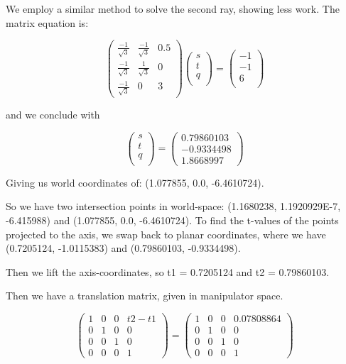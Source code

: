 \documentclass{letter}
\begin{document}
We employ a similar method to solve the second ray, showing less work. The matrix equation is:

$$
\begin{pmatrix}
\frac{-1}{\sqrt{3}} & \frac{-1}{\sqrt{3}} & 0.5 \\
\frac{-1}{\sqrt{3}} & \frac{1}{\sqrt{3}} & 0 \\
\frac{-1}{\sqrt{3}} & 0 & 3
\end{pmatrix}
\begin{pmatrix}
s \\
t \\
q \\
\end{pmatrix}
=
\begin{pmatrix}
-1 \\
-1 \\
6 \\
\end{pmatrix}
$$

and we conclude with 

$$
\begin{pmatrix}
s \\
t \\
q\\
\end{pmatrix}
=
\begin{pmatrix}
0.79860103 \\ -0.9334498 \\ 1.8668997
\end{pmatrix}
$$

Giving us world coordinates of: ({1.077855, 0.0, -6.4610724}). 

So we have two intersection points in world-space: ({1.1680238, 1.1920929E-7, -6.415988}) and ({1.077855, 0.0, -6.4610724}). To find the t-values of the points projected to the axis, we swap back to planar coordinates, where we have (0.7205124, -1.0115383) and (0.79860103, -0.9334498).

Then we lift the axis-coordinates, so t1 = 0.7205124 and t2 = 0.79860103. 

Then we have a translation matrix, given in manipulator space. 

$$
\begin{pmatrix}
1 & 0 & 0 & t2 - t1 \\
0 & 1 & 0 & 0 \\
0 & 0 & 1 & 0 \\
0 & 0 & 0 & 1
\end{pmatrix}
= 
\begin{pmatrix}
1 & 0 & 0 & 0.07808864 \\
0 & 1 & 0 & 0 \\
0 & 0 & 1 & 0 \\
0 & 0 & 0 & 1
\end{pmatrix}
$$
\end{document}
